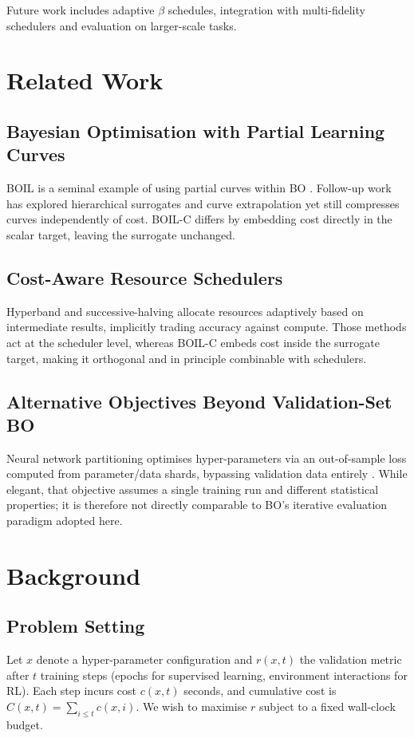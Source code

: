\documentclass{article} %
\begin{document}
Future work includes adaptive \(\beta\) schedules, integration with multi-fidelity schedulers and evaluation on larger-scale tasks.

\section{Related Work}
\label{sec:related}
\subsection{Bayesian Optimisation with Partial Learning Curves}
BOIL is a seminal example of using partial curves within BO \cite{nguyen-2019-bayesian}. Follow-up work has explored hierarchical surrogates and curve extrapolation yet still compresses curves independently of cost. BOIL-C differs by embedding cost directly in the scalar target, leaving the surrogate unchanged.

\subsection{Cost-Aware Resource Schedulers}
Hyperband and successive-halving allocate resources adaptively based on intermediate results, implicitly trading accuracy against compute. Those methods act at the scheduler level, whereas BOIL-C embeds cost inside the surrogate target, making it orthogonal and in principle combinable with schedulers.

\subsection{Alternative Objectives Beyond Validation-Set BO}
Neural network partitioning optimises hyper-parameters via an out-of-sample loss computed from parameter/data shards, bypassing validation data entirely \cite{mlodozeniec-2023-hyperparameter}. While elegant, that objective assumes a single training run and different statistical properties; it is therefore not directly comparable to BO's iterative evaluation paradigm adopted here.

\section{Background}
\label{sec:background}
\subsection{Problem Setting}
Let \(x\) denote a hyper-parameter configuration and \(r(x,t)\) the validation metric after \(t\) training steps (epochs for supervised learning, environment interactions for RL). Each step incurs cost \(c(x,t)\) seconds, and cumulative cost is \(C(x,t) = \sum_{i \le t} c(x,i)\). We wish to maximise \(r\) subject to a fixed wall-clock budget.
\end{document}
